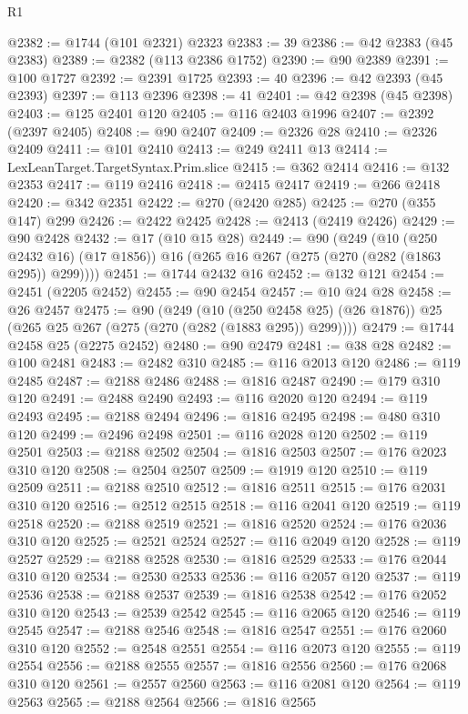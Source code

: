 \begin{lexlean}{R1}
\begin{coremodule}
@2382 := @1744 (@101 @2321) @2323
@2383 := 39
@2386 := @42 @2383 (@45 @2383)
@2389 := @2382 (@113 @2386 @1752)
@2390 := @90 @2389
@2391 := @100 @1727
@2392 := @2391 @1725
@2393 := 40
@2396 := @42 @2393 (@45 @2393)
@2397 := @113 @2396
@2398 := 41
@2401 := @42 @2398 (@45 @2398)
@2403 := @125 @2401 @120
@2405 := @116 @2403 @1996
@2407 := @2392 (@2397 @2405)
@2408 := @90 @2407
@2409 := @2326 @28
@2410 := @2326 @2409
@2411 := @101 @2410
@2413 := @249 @2411 @13
@2414 := LexLeanTarget.TargetSyntax.Prim.slice
@2415 := @362 @2414
@2416 := @132 @2353
@2417 := @119 @2416
@2418 := @2415 @2417
@2419 := @266 @2418
@2420 := @342 @2351
@2422 := @270 (@2420 @285)
@2425 := @270 (@355 @147) @299
@2426 := @2422 @2425
@2428 := @2413 (@2419 @2426)
@2429 := @90 @2428
@2432 := @17 (@10 @15 @28)
@2449 := @90
    (@249
      (@10 (@250 @2432 @16) (@17 @1856))
      @16
      (@265 @16 @267 (@275 (@270 (@282 (@1863 @295)) @299))))
@2451 := @1744 @2432 @16
@2452 := @132 @121
@2454 := @2451 (@2205 @2452)
@2455 := @90 @2454
@2457 := @10 @24 @28
@2458 := @26 @2457
@2475 := @90
    (@249
      (@10 (@250 @2458 @25) (@26 @1876))
      @25
      (@265 @25 @267 (@275 (@270 (@282 (@1883 @295)) @299))))
@2479 := @1744 @2458 @25 (@2275 @2452)
@2480 := @90 @2479
@2481 := @38 @28
@2482 := @100 @2481
@2483 := @2482 @310
@2485 := @116 @2013 @120
@2486 := @119 @2485
@2487 := @2188 @2486
@2488 := @1816 @2487
@2490 := @179 @310 @120
@2491 := @2488 @2490
@2493 := @116 @2020 @120
@2494 := @119 @2493
@2495 := @2188 @2494
@2496 := @1816 @2495
@2498 := @480 @310 @120
@2499 := @2496 @2498
@2501 := @116 @2028 @120
@2502 := @119 @2501
@2503 := @2188 @2502
@2504 := @1816 @2503
@2507 := @176 @2023 @310 @120
@2508 := @2504 @2507
@2509 := @1919 @120
@2510 := @119 @2509
@2511 := @2188 @2510
@2512 := @1816 @2511
@2515 := @176 @2031 @310 @120
@2516 := @2512 @2515
@2518 := @116 @2041 @120
@2519 := @119 @2518
@2520 := @2188 @2519
@2521 := @1816 @2520
@2524 := @176 @2036 @310 @120
@2525 := @2521 @2524
@2527 := @116 @2049 @120
@2528 := @119 @2527
@2529 := @2188 @2528
@2530 := @1816 @2529
@2533 := @176 @2044 @310 @120
@2534 := @2530 @2533
@2536 := @116 @2057 @120
@2537 := @119 @2536
@2538 := @2188 @2537
@2539 := @1816 @2538
@2542 := @176 @2052 @310 @120
@2543 := @2539 @2542
@2545 := @116 @2065 @120
@2546 := @119 @2545
@2547 := @2188 @2546
@2548 := @1816 @2547
@2551 := @176 @2060 @310 @120
@2552 := @2548 @2551
@2554 := @116 @2073 @120
@2555 := @119 @2554
@2556 := @2188 @2555
@2557 := @1816 @2556
@2560 := @176 @2068 @310 @120
@2561 := @2557 @2560
@2563 := @116 @2081 @120
@2564 := @119 @2563
@2565 := @2188 @2564
@2566 := @1816 @2565

\end{coremodule}
\end{lexlean}
